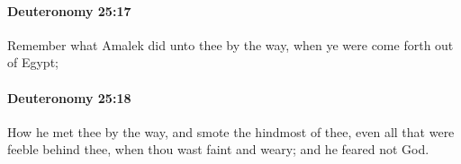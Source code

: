 		\paragraph{Deuteronomy 25:17} %
			\label{DEUTERONOMY-25-17}

			Remember what Amalek did unto thee by the way, when ye were come forth out of Egypt;


		\paragraph{Deuteronomy 25:18} %
			\label{DEUTERONOMY-25-18}

			How he met thee by the way, and smote the hindmost of thee, even all that were feeble behind thee, when thou wast faint and weary; and he feared not God.


